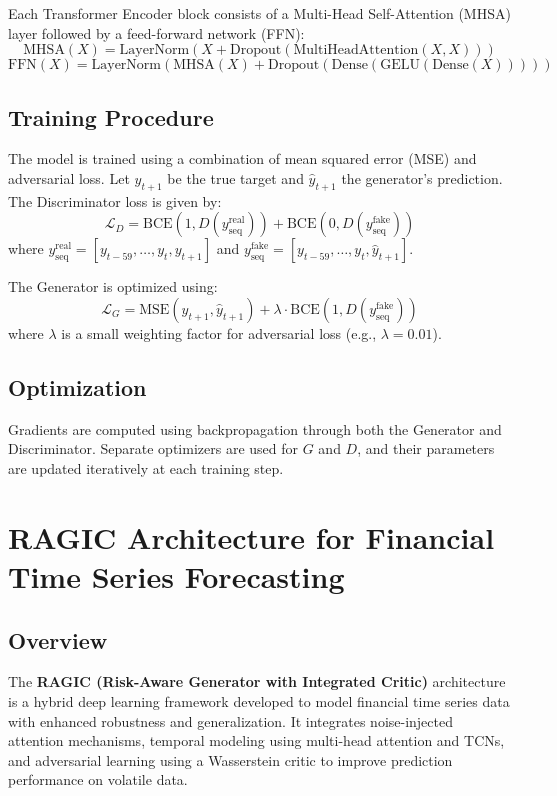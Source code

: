 Each Transformer Encoder block consists of a Multi-Head Self-Attention (MHSA) layer followed by a feed-forward network (FFN):
\[
\text{MHSA}(X) = \text{LayerNorm}(X + \text{Dropout}(\text{MultiHeadAttention}(X, X)))
\]
\[
\text{FFN}(X) = \text{LayerNorm}(\text{MHSA}(X) + \text{Dropout}(\text{Dense}(\text{GELU}(\text{Dense}(X)))))
\]

\subsection{Training Procedure}

The model is trained using a combination of mean squared error (MSE) and adversarial loss. Let $y_{t+1}$ be the true target and $\hat{y}_{t+1}$ the generator's prediction. The Discriminator loss is given by:
\[
\mathcal{L}_D = \text{BCE}(1, D(y_{\text{seq}}^{\text{real}})) + \text{BCE}(0, D(y_{\text{seq}}^{\text{fake}}))
\]
where $y_{\text{seq}}^{\text{real}} = [y_{t-59}, \dots, y_t, y_{t+1}]$ and $y_{\text{seq}}^{\text{fake}} = [y_{t-59}, \dots, y_t, \hat{y}_{t+1}]$.

The Generator is optimized using:
\[
\mathcal{L}_G = \text{MSE}(y_{t+1}, \hat{y}_{t+1}) + \lambda \cdot \text{BCE}(1, D(y_{\text{seq}}^{\text{fake}}))
\]
where $\lambda$ is a small weighting factor for adversarial loss (e.g., $\lambda = 0.01$).

\subsection{Optimization}

Gradients are computed using backpropagation through both the Generator and Discriminator. Separate optimizers are used for $G$ and $D$, and their parameters are updated iteratively at each training step.

\section{RAGIC Architecture for Financial Time Series Forecasting}

\subsection{Overview}

The \textbf{RAGIC (Risk-Aware Generator with Integrated Critic)} architecture is a hybrid deep learning framework developed to model financial time series data with enhanced robustness and generalization. It integrates noise-injected attention mechanisms, temporal modeling using multi-head attention and TCNs, and adversarial learning using a Wasserstein critic to improve prediction performance on volatile data.

